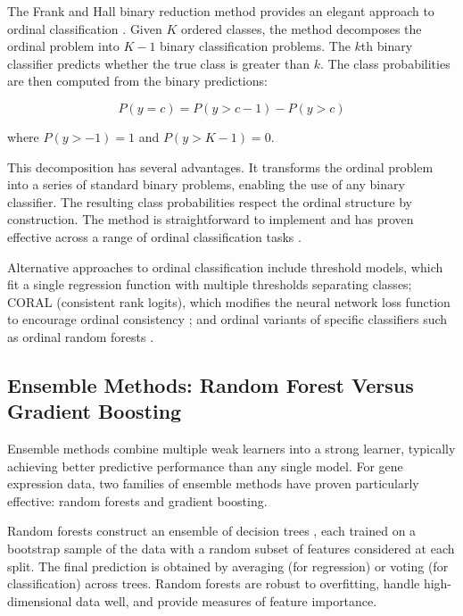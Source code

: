 The Frank and Hall binary reduction method provides an elegant approach to ordinal classification \parencite{frank_simple_2001}. Given $K$ ordered classes, the method decomposes the ordinal problem into $K-1$ binary classification problems. The $k$th binary classifier predicts whether the true class is greater than $k$. The class probabilities are then computed from the binary predictions:

\begin{equation}
    P(y = c) = P(y > c-1) - P(y > c)
    \label{eq:ordinal_prob}
\end{equation}

where $P(y > -1) = 1$ and $P(y > K-1) = 0$.

This decomposition has several advantages. It transforms the ordinal problem into a series of standard binary problems, enabling the use of any binary classifier. The resulting class probabilities respect the ordinal structure by construction. The method is straightforward to implement and has proven effective across a range of ordinal classification tasks \parencite{frank_simple_2001}.

Alternative approaches to ordinal classification include threshold models, which fit a single regression function with multiple thresholds separating classes; CORAL (consistent rank logits), which modifies the neural network loss function to encourage ordinal consistency \parencite{cao_rank_2020}; and ordinal variants of specific classifiers such as ordinal random forests \parencite{hornung_ordinal_2020}.

\subsection{Ensemble Methods: Random Forest Versus Gradient Boosting}

Ensemble methods combine multiple weak learners into a strong learner, typically achieving better predictive performance than any single model. For gene expression data, two families of ensemble methods have proven particularly effective: random forests and gradient boosting.

Random forests construct an ensemble of decision trees \parencite{breiman_random_2001}, each trained on a bootstrap sample of the data with a random subset of features considered at each split. The final prediction is obtained by averaging (for regression) or voting (for classification) across trees. Random forests are robust to overfitting, handle high-dimensional data well, and provide measures of feature importance.


